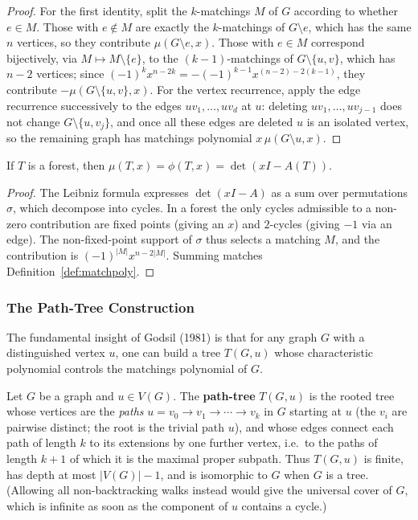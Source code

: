 \begin{proof}
For the first identity, split the $k$-matchings $M$ of $G$ according to
whether $e \in M$. Those with $e \notin M$ are exactly the $k$-matchings
of $G \setminus e$, which has the same $n$ vertices, so they contribute
$\mu(G \setminus e, x)$. Those with $e \in M$ correspond bijectively,
via $M \mapsto M \setminus \{e\}$, to the $(k - 1)$-matchings of
$G \setminus \{u, v\}$, which has $n - 2$ vertices; since
$(-1)^k x^{n - 2k} = -(-1)^{k - 1} x^{(n - 2) - 2(k - 1)}$, they
contribute $-\mu(G \setminus \{u, v\}, x)$. For the vertex recurrence,
apply the edge recurrence successively to the edges $uv_1, \ldots, uv_d$
at $u$: deleting $uv_1, \ldots, uv_{j-1}$ does not change
$G \setminus \{u, v_j\}$, and once all these edges are deleted $u$ is an
isolated vertex, so the remaining graph has matchings polynomial
$x\,\mu(G \setminus u, x)$.
\end{proof}

\begin{proposition}\label{prop:matchforest}
If $T$ is a forest, then $\mu(T, x) = \phi(T, x) = \det(xI - A(T))$.
\end{proposition}

\begin{proof}
The Leibniz formula expresses $\det(xI - A)$ as a sum over permutations
$\sigma$, which decompose into cycles. In a forest the only cycles
admissible to a non-zero contribution are fixed points (giving an $x$)
and $2$-cycles (giving $-1$ via an edge). The non-fixed-point support
of $\sigma$ thus selects a matching $M$, and the contribution is
$(-1)^{|M|} x^{n - 2|M|}$. Summing matches Definition~\ref{def:matchpoly}.
\end{proof}

\subsubsection{The Path-Tree Construction}

The fundamental insight of Godsil (1981) is that for any
graph $G$ with a distinguished vertex $u$, one can build a tree
$T(G, u)$ whose characteristic polynomial controls the matchings
polynomial of $G$.

\begin{definition}\label{def:pathtree}
Let $G$ be a graph and $u \in V(G)$. The \textbf{path-tree}
$T(G, u)$ is the rooted tree whose vertices are the \emph{paths}
$u = v_0 \to v_1 \to \cdots \to v_k$ in $G$ starting at $u$ (the
$v_i$ are pairwise distinct; the root is the trivial path $u$),
and whose edges connect each path of length $k$ to its extensions
by one further vertex, i.e.\ to the paths of length $k + 1$ of which
it is the maximal proper subpath. Thus $T(G, u)$ is finite, has depth
at most $|V(G)| - 1$, and is isomorphic to $G$ when $G$ is a tree.
(Allowing all non-backtracking walks instead would give the universal
cover of $G$, which is infinite as soon as the component of $u$
contains a cycle.)
\end{definition}

